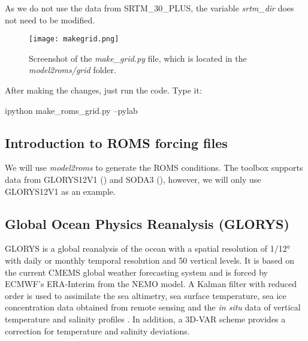 \begin{tcolorbox}[enhanced,
    grow to left by   = 0cm,
    grow to right by  = 0cm,
    enlarge top by    = 0cm,
    enlarge bottom by = 0cm,
    tcbox raise base,
    boxrule           = 1.0pt,
    left              = 18mm,
    colframe          = red!50!black,coltext=red!25!black,colback=red!10!white,
    overlay           = {\begin{tcbclipinterior}\fill[red!75!blue!50!white] (frame.south west)
      rectangle node[text=white,font=\sffamily\bfseries\footnotesize,rotate=0] {WARNING} ([xshift=18mm]frame.north west);\end{tcbclipinterior}}]
As we do not use the data from SRTM\_30\_PLUS, the variable \textit{srtm\_dir} does not need to be modified.
\end{tcolorbox}
\bigskip

\begin{figure}[H]
    \centering
    \texttt{[image: makegrid.png]}
    \caption{Screenshot of the \textit{make\_grid.py} file, which is located in the \textit{model2roms/grid} folder.}
    \label{fazgrade}
\end{figure}
\bigskip

\noindent After making the changes, just run the code. Type it:
\bigskip

\begin{bashcode}
ipython make_roms_grid.py --pylab
\end{bashcode}
\bigskip

\subsection{Introduction to ROMS forcing files}
\bigskip

\noindent We will use \textit{model2roms} to generate the ROMS conditions. The toolbox supports data from GLORYS12V1 (\cite{Fernandez2018}) 
and SODA3 (\cite{Carton2018}), however, we will only use GLORYS12V1 as an example.

\subsection{Global Ocean Physics Reanalysis (GLORYS)}
\bigskip

\noindent GLORYS is a global reanalysis of the ocean with a spatial resolution of 1/12° with daily or monthly temporal resolution and 
50 vertical levels. It is based on the current CMEMS global weather forecasting system and is forced by ECMWF's ERA-Interim from the NEMO model.
A Kalman filter with reduced order is used to assimilate the sea altimetry, sea surface temperature, sea ice concentration data obtained 
from remote sensing and the \textit{in situ} data of vertical temperature and salinity profiles .
In addition, a 3D-VAR scheme provides a correction for temperature and salinity deviations.
\bigskip

